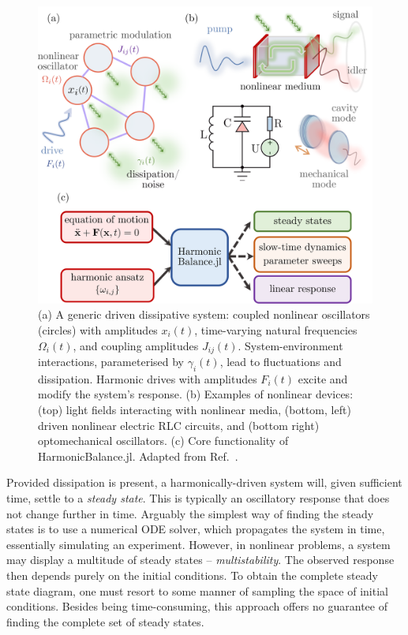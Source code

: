\begin{figure} [ht!]
	\centering
	\includegraphics[width=\textwidth]{figures/intro/flow_diag.png}
	\caption{(a) A generic driven dissipative system: coupled nonlinear oscillators (circles) with amplitudes $x_i(t)$, time-varying natural frequencies $\Omega_i(t)$, and coupling amplitudes $J_{ij}(t)$. System-environment interactions, parameterised by $\gamma_i(t)$, lead to fluctuations and dissipation. Harmonic drives with amplitudes $F_i(t)$ excite and modify the system's response. (b) Examples of nonlinear devices: (top) light fields interacting with nonlinear media, (bottom, left) driven nonlinear electric RLC circuits, and (bottom right) optomechanical oscillators. (c) Core functionality of HarmonicBalance.jl. Adapted from Ref.~\cite{Kosata_2022b}.}
	\label{fig:intro_setup}
\end{figure} 

Provided dissipation is present, a harmonically-driven system will, given sufficient time, settle to a \textit{steady state}. This is typically an oscillatory response that does not change further in time. Arguably the simplest way of finding the steady states is to use a numerical ODE solver, which propagates the system in time, essentially simulating an experiment. However, in nonlinear problems, a system may display a multitude of steady states -- \textit{multistability}. The observed response then depends purely on the initial conditions. To obtain the complete steady state diagram, one must resort to some manner of sampling the space of initial conditions. Besides being time-consuming, this approach offers no guarantee of finding the complete set of steady states.

